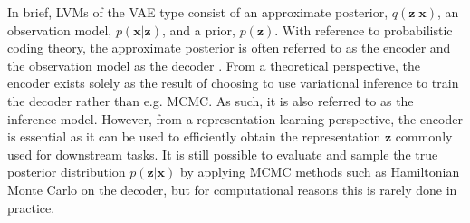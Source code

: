 {In brief, LVMs of the VAE type consist of an approximate posterior, $q(\mathbf{z}|\mathbf{x})$, an observation model, $p(\mathbf{x}|\mathbf{z})$, and a prior, $p(\mathbf{z})$. 
With reference to probabilistic coding theory, the approximate posterior is often referred to as the encoder and the observation model as the decoder \parencite{kingma_autoencoding_2014, rezende_stochastic_2014}. From a theoretical perspective, the encoder exists solely as the result of choosing to use variational inference to train the decoder rather than e.g. MCMC. As such, it is also referred to as the inference model. However, from a representation learning perspective, the encoder is essential as it can be used to efficiently obtain the representation $\mathbf{z}$ commonly used for downstream tasks. 
It is still possible to evaluate and sample the true posterior distribution $p(\mathbf{z}|\mathbf{x})$ by applying MCMC methods such as Hamiltonian Monte Carlo on the decoder, but for computational reasons this is rarely done in practice. 

}
